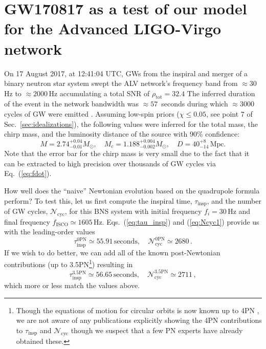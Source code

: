 \documentclass[prd,amsmath,amssymb,aps,floats,amsfonts,notitlepage,superscriptaddress,eqsecnum,nofootinbib,10pt]{revtex4-1}
\newcommand{\be}{\begin{equation}}
\newcommand{\ee}{\end{equation}}
\begin{document}
\section{GW170817 as a test of our model for the Advanced LIGO-Virgo network}\label{sec:GW170817}
On 17 August 2017, at 12:41:04 UTC, GWs from the inspiral and merger of a binary neutron star system %
swept the ALV network's frequency band from $\approx 30\,$Hz to $\approx 2000\,$Hz accumulating a total SNR of
$\rho_\text{tot} = 32.4$ \cite{GW170817}
The inferred duration of the event in the network bandwidth was $\approx 57\,$ seconds during which $\approx 3000$ cycles of GW were emitted \cite{GW170817_Facts}.
Assuming low-spin priors  ($\chi \le 0.05$, see point 7 of Sec.~\ref{sec:idealizations}), the following values were inferred for the total mass, the chirp mass,
and the luminosity distance of the source with 90\% confidence:
%
\be
M = 2.74^{+0.04}_{-0.01} M_\odot,\quad M_c = 1.188^{+0.004}_{-0.002} M_\odot,\quad D= 40^{+8}_{-14}\,\text{Mpc}. \label{eq:GW170817_params}
\ee
%
Note that the error bar for the chirp mass is very small
due to the fact that it can be extracted to high precision over thousands of GW cycles via Eq.~(\ref{eq:fdot}).

How well does the ``naive'' Newtonian evolution based on the quadrupole formula perform? 
To test this, let us first compute the inspiral time, $\tau_\text{insp}$, and the number of GW cycles, $\mathcal{N}_\text{cyc}$, for this BNS system with initial frequency $f_i=30\,$Hz and final frequency $f_\text{ISCO} \simeq 1605\,$Hz. 
Eqs.~(\ref{eq:tau_insp}) and (\ref{eq:Ncyc1}) provide us with the leading-order values
%
\be
\tau_\text{insp}^{0\text{PN}} \simeq 55.91\,\text{seconds}, \quad \mathcal{N}_\text{cyc}^{0\text{PN}} \simeq 2680\,\label{eq:GW170817_values_0PN}. 
\ee
%
If we wish to do better, we can add all of the known post-Newtonian contributions 
(up to 3.5PN\footnote{Though the equations of motion for circular orbits is now known up to 4PN \cite{4PN_EoM_paper}, we are not aware of any publications
explicitly showing the 4PN contributions to $\tau_\text{insp}$ and $\mathcal{N}_\text{cyc}$ though we suspect that a few PN experts have already obtained these.}) resulting in
%
\be
\tau_\text{insp}^{3.5\text{PN}} \simeq 56.65\,\text{seconds}, \quad \mathcal{N}_\text{cyc}^{3.5\text{PN}} \simeq 2711 \label{eq:GW170817_values_3p5PN}\, ,
\ee
%
which more or less match the values above. %
\end{document}
